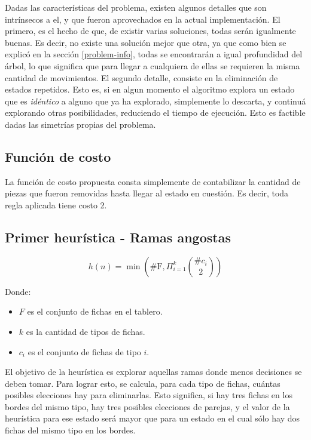 \documentclass[a4paper,10pt]{article}
\begin{document}
    \label{implementation-details}
    Dadas las características del problema, existen algunos detalles que son intrínsecos a el, y que fueron aprovechados en la actual implementación. El primero, es el hecho
    de que, de existir varias soluciones, todas serán igualmente buenas. Es decir, no existe una solución mejor que otra, ya que como bien se explicó en la sección \ref{problem-info}, 
    todas se encontrarán a igual profundidad del árbol, lo que significa que para llegar a cualquiera de ellas se requieren la misma cantidad de movimientos. El segundo detalle, 
    consiste en la eliminación de estados repetidos. Esto es, si en algun momento el algoritmo explora un estado que es \textit{idéntico} a alguno que ya ha explorado, simplemente
    lo descarta, y continuá explorando otras posibilidades, reduciendo el tiempo de ejecución. Esto es factible dadas las simetrías propias del problema.\\

    \subsection{Función de costo}

    La función de costo propuesta consta simplemente de contabilizar la cantidad de piezas que fueron removidas hasta llegar al estado en cuestión. Es decir, toda regla aplicada 
    tiene costo 2. \\

    \subsection{Primer heurística - Ramas angostas}
    
    \[ h(n) = \min \left (\text{\# F}, \Pi_{i=1}^{k} {\# c_i \choose 2} \right )\] 

    Donde:
    \begin{itemize}
        \item $F$ es el conjunto de fichas en el tablero.
        \item $k$ es la cantidad de tipos de fichas.
        \item $c_i$ es el conjunto de fichas de tipo $i$.
    \end{itemize}

    El objetivo de la heurística es explorar aquellas ramas donde menos decisiones se deben tomar. Para lograr esto, se calcula, para cada tipo de fichas, cuántas posibles elecciones hay para eliminarlas. Esto significa, si hay tres fichas en los bordes del mismo tipo, hay tres posibles elecciones de parejas, y el valor de la heurística para ese estado será mayor que para un estado en el cual sólo hay dos fichas del mismo tipo en los bordes.
\end{document}
